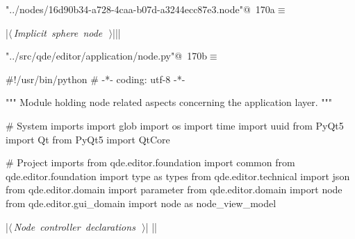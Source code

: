\documentclass[%
    a4paper,    %
    justified,  %
    nobib,      %
    openany     %
]{tufte-book}
\begin{document}
\begin{flushleft} \small
\begin{minipage}{\linewidth}\label{scrap192}\raggedright\small
{} \verb@"../nodes/16d90b34-a728-4caa-b07d-a3244ecc87e3.node"@\nobreak\ {\footnotesize {170a}}$\equiv$
\vspace{-1ex}
\begin{pythoncode}
|\hbox{$\langle\,${\itshape Implicit sphere node}\nobreak\ {\footnotesize {}}$\,\rangle$}||\NWsep|
\end{pythoncode}
\vspace{1.5ex}
\footnotesize
\begin{list}{}{\setlength{\itemsep}{-\parsep}\setlength{\itemindent}{-\leftmargin}}

\item{}
\end{list}
\end{minipage}\vspace{4ex}
\end{flushleft}
\begin{flushleft} \small
\begin{minipage}{\linewidth}\label{scrap193}\raggedright\small
{} \verb@"../src/qde/editor/application/node.py"@\nobreak\ {\footnotesize {170b}}$\equiv$
\vspace{-1ex}
\begin{pythoncode}
#!/usr/bin/python
# -*- coding: utf-8 -*-

""" Module holding node related aspects concerning the application layer.
"""

# System imports
import glob
import os
import time
import uuid
from PyQt5 import Qt
from PyQt5 import QtCore

# Project imports
from qde.editor.foundation import common
from qde.editor.foundation import type as types
from qde.editor.technical  import json
from qde.editor.domain     import parameter
from qde.editor.domain     import node
from qde.editor.gui_domain import node as node_view_model


|\hbox{$\langle\,${\itshape Node controller declarations}\nobreak\ {\footnotesize {}}$\,\rangle$}|
|\NWsep|
\end{pythoncode}
\vspace{1.5ex}
\footnotesize
\begin{list}{}{\setlength{\itemsep}{-\parsep}\setlength{\itemindent}{-\leftmargin}}

\item{}
\end{list}
\end{minipage}\vspace{4ex}
\end{flushleft}
\end{document}
